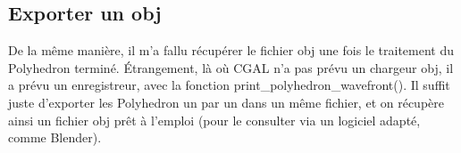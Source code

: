 \documentclass[a4paper,french]{article}
\begin{document}
		\subsection{Exporter un obj}
			De la même manière, il m'a fallu récupérer le fichier obj une fois le traitement du Polyhedron terminé. Étrangement, là où CGAL n'a pas prévu un chargeur obj, il a prévu un enregistreur, avec la fonction print\_polyhedron\_wavefront(). Il suffit juste d'exporter les Polyhedron un par un dans un même fichier, et on récupère ainsi un fichier obj prêt à l'emploi (pour le consulter via un logiciel adapté, comme Blender).
		
	\newpage


		
\end{document}
